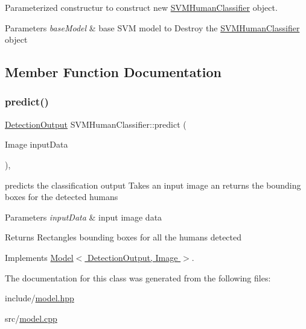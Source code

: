 Parameterized constructur to construct new \hyperlink{classSVMHumanClassifier}{S\+V\+M\+Human\+Classifier} object. 


\begin{DoxyParams}{Parameters}
{\em base\+Model} & base S\+VM model to Destroy the \hyperlink{classSVMHumanClassifier}{S\+V\+M\+Human\+Classifier} object \\
\hline
\end{DoxyParams}


\subsection{Member Function Documentation}
\mbox{\label{classSVMHumanClassifier_a14a416a22355b1426d7611082dfa2464}} 
\subsubsection{\texorpdfstring{predict()}{predict()}}
{\footnotesize\ttfamily \hyperlink{classData}{Detection\+Output} S\+V\+M\+Human\+Classifier\+::predict (\begin{DoxyParamCaption}\item[{Image}]{input\+Data }\end{DoxyParamCaption})\hspace{0.3cm}{\ttfamily [override]}, {\ttfamily [virtual]}}



predicts the classification output Takes an input image an returns the bounding boxes for the detected humans 


\begin{DoxyParams}{Parameters}
{\em input\+Data} & input image data \\
\hline
\end{DoxyParams}
\begin{DoxyReturn}{Returns}
Rectangles bounding boxes for all the humans detected 
\end{DoxyReturn}


Implements \hyperlink{classModel_aab70aeca992eb3a1ce09667e169b8743}{Model$<$ Detection\+Output, Image $>$}.



The documentation for this class was generated from the following files\+:\begin{DoxyCompactItemize}
\item 
include/\hyperlink{model_8hpp}{model.\+hpp}\item 
src/\hyperlink{model_8cpp}{model.\+cpp}\end{DoxyCompactItemize}
